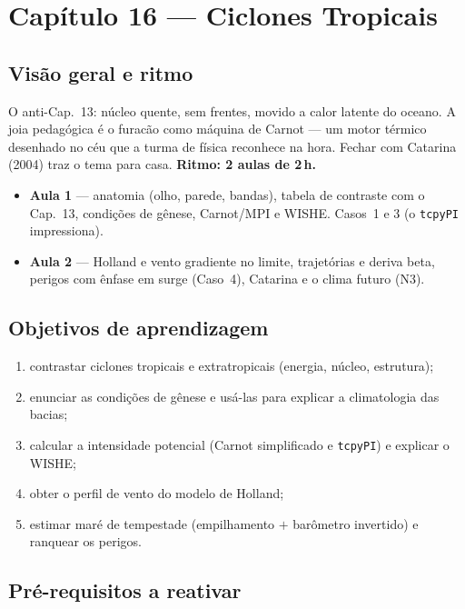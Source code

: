 \section{Capítulo 16 --- Ciclones Tropicais}

\subsection*{Visão geral e ritmo}

O anti-Cap.~13: núcleo quente, sem frentes, movido a calor latente do
oceano. A joia pedagógica é o furacão como máquina de Carnot — um
motor térmico desenhado no céu que a turma de física reconhece na
hora. Fechar com Catarina (2004) traz o tema para casa.
\textbf{Ritmo: 2 aulas de 2\,h.}

\begin{itemize}
  \item \textbf{Aula 1} — anatomia (olho, parede, bandas), tabela de
        contraste com o Cap.~13, condições de gênese, Carnot/MPI e
        WISHE. Casos~1 e 3 (o \texttt{tcpyPI} impressiona).
  \item \textbf{Aula 2} — Holland e vento gradiente no limite,
        trajetórias e deriva beta, perigos com ênfase em surge
        (Caso~4), Catarina e o clima futuro (N3).
\end{itemize}

\subsection*{Objetivos de aprendizagem}

\begin{enumerate}
  \item contrastar ciclones tropicais e extratropicais (energia,
        núcleo, estrutura);
  \item enunciar as condições de gênese e usá-las para explicar a
        climatologia das bacias;
  \item calcular a intensidade potencial (Carnot simplificado e
        \texttt{tcpyPI}) e explicar o WISHE;
  \item obter o perfil de vento do modelo de Holland;
  \item estimar maré de tempestade (empilhamento $+$ barômetro
        invertido) e ranquear os perigos.
\end{enumerate}

\subsection*{Pré-requisitos a reativar}


